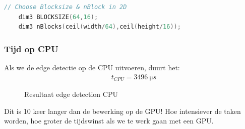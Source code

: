 \documentclass[11pt,twoside,a4paper]{article}
\begin{document}
\begin{lstlisting}[language=C, caption=Keuze Blocksize en nBlock, frame=single]
	// Choose Blocksize & nBlock in 2D
	dim3 BLOCKSIZE(64,16);
	dim3 nBlocks(ceil(width/64),ceil(height/16));
\end{lstlisting}\label{listing1}


\subsubsection{Tijd op CPU}
Als we de edge detectie op de CPU uitvoeren, duurt het:
\begin{align*}
    &t_{CPU} = \SI{3496}{\micro s}
\end{align*}



\begin{figure}[h!]
    \centering
    \hfill
    \caption{Resultaat edge detection CPU}
    \label{fig:edge_dection_cpu}
\end{figure}

Dit is 10 keer langer dan de bewerking op de GPU! Hoe intensiever de taken worden, hoe groter de tijdswinst als we te werk gaan met een GPU.
\end{document}
